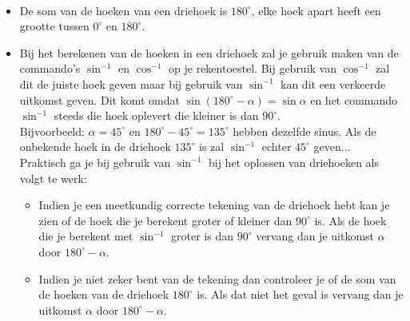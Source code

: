 \begin{opmerking}
	\ \\
	
	\begin{itemize}
        \item De som van de hoeken van een driehoek is $180^\circ$, elke hoek apart heeft een grootte tussen $0^\circ$ en $180^\circ$.
		\item Bij het berekenen van de hoeken in een driehoek zal je gebruik maken van de commando's $\sin^{-1}$ en $\cos^{-1}$ op je rekentoestel. Bij gebruik van $\cos^{-1}$ zal dit de juiste hoek geven maar bij gebruik van $\sin^{-1}$ kan dit een verkeerde uitkomst geven. Dit komt omdat $\sin(180^\circ -\alpha)=\sin\alpha$ en het commando $\sin^{-1}$ steeds die hoek oplevert die kleiner is dan $90^\circ$.\\ Bijvoorbeeld: $\alpha = 45^\circ$ en $180^\circ-45^\circ = 135^\circ$ hebben dezelfde sinus. Als de onbekende hoek in de driehoek $135^\circ$ is zal $\sin^{-1}$ echter $45^\circ$ geven... \\
Praktisch ga je bij gebruik van $\sin^{-1}$ bij het oplossen van driehoeken als volgt te werk:	
	
\begin{itemize}
	\item Indien je een meetkundig correcte tekening van de driehoek hebt kan je zien of de hoek die je berekent groter of kleiner dan $90^\circ$ is. Als de hoek die je berekent met $\sin^{-1}$ groter is dan $90^\circ$ vervang dan je uitkomst $\alpha$ door $180^\circ -\alpha$.
	\item Indien je niet zeker bent van de tekening dan controleer je of de som van de hoeken van de driehoek $180^\circ$ is. Als dat niet het geval is vervang dan je uitkomst $\alpha$ door $180^\circ -\alpha$.
\end{itemize}
	
\end{itemize}
\end{opmerking}

